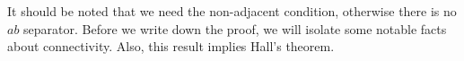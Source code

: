 \documentclass[a4paper]{scrreprt}
\begin{document}
\begin{remark}
	It should be noted that we need the non-adjacent condition, otherwise there is no $ab$ separator. Before we write down the proof, we will isolate some notable facts about connectivity.
	Also, this result implies Hall's theorem.
\end{remark}
\end{document}
